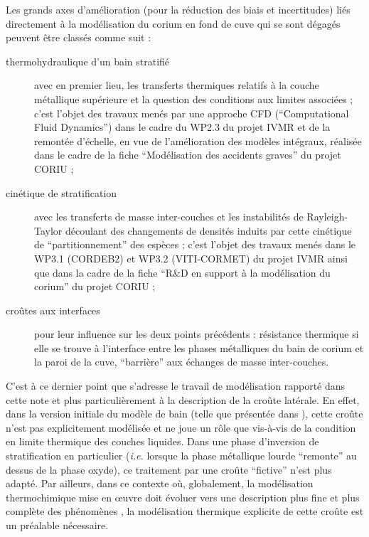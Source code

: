 Les grands axes d'amélioration (pour la réduction des biais et incertitudes) liés directement à la modélisation du corium en fond de cuve qui se sont dégagés peuvent être classés comme suit \cite{LeTellier2014,Fichot2018} :
\begin{description}
 \item[thermohydraulique d'un bain stratifié] avec en premier lieu, les transferts thermiques relatifs à la couche métallique supérieure et la question des conditions aux limites associées ; c'est l'objet des travaux menés par une approche CFD (``Computational Fluid Dynamics'') dans le cadre du WP2.3 du projet IVMR et de la remontée d'échelle, en vue de l'amélioration des modèles intégraux, réalisée dans le cadre de la fiche ``Modélisation des accidents graves'' du projet CORIU \cite{Peybernes2019} ; 
 \item[cinétique de stratification] avec les transferts de masse inter-couches et les instabilités de Rayleigh-Taylor découlant des changements de densités induits par cette cinétique de ``partitionnement'' des espèces ; c'est l'objet des travaux menés dans le WP3.1 (CORDEB2) et WP3.2 (VITI-CORMET) du projet IVMR \cite{Pivano2019} ainsi que dans la cadre de la fiche ``R\&D en support à la modélisation du corium'' du projet CORIU \cite{LeTellier2018} ;
 \item[croûtes aux interfaces] pour leur influence sur les deux points précédents : résistance thermique si elle se trouve à l'interface entre les phases métalliques du bain de corium et la paroi de la cuve, ``barrière'' aux échanges de masse inter-couches.
\end{description}
C'est à ce dernier point que s'adresse le travail de modélisation rapporté dans cette note et plus particulièrement à la description de la croûte latérale. En effet, dans la version initiale du modèle de bain (telle que présentée dans \cite{LeTellier2014}), cette croûte n'est pas explicitement modélisée et ne joue un rôle que vis-à-vis de la condition en limite thermique des couches liquides. Dans une phase d'inversion de stratification en particulier (\textit{i.e.} lorsque la phase métallique lourde ``remonte'' au dessus de la phase oxyde), ce traitement par une croûte ``fictive'' n'est plus adapté. Par ailleurs, dans ce contexte où, globalement, la modélisation thermochimique mise en \oe{}uvre doit évoluer vers une description plus fine et plus complète des phénomènes \cite{Fichot2015}, la modélisation thermique explicite de cette croûte est un préalable nécessaire. 
